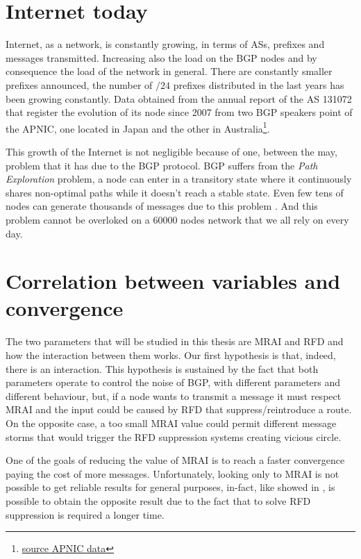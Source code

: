 \section{Internet today}
\label{sec:internet_today}

Internet, as a network, is constantly growing, in terms of \acp{AS}, prefixes
and messages transmitted.
Increasing also the load on the \ac{BGP} nodes and by consequence the load
of the network in general.
There are constantly smaller prefixes announced, the number of $/24$ prefixes
distributed in the last years has been growing constantly.
Data obtained from the annual report of the \ac{AS} 131072 that register the
evolution of its node since \num{2007} from two \ac{BGP}
speakers point of the \ac{APNIC}, one located in Japan and the other in
Australia\footnote{\href{https://blog.apnic.net/2021/01/05/bgp-in-2020-the-bgp-table/}{source APNIC data}}.

This growth of the Internet is not negligible because of one, between the may,
problem that it has due to the \ac{BGP} protocol.
\ac{BGP} suffers from the \textit{Path Exploration} problem, a node can enter in
a transitory state where it continuously shares non-optimal paths while it
doesn't reach a stable state.
Even few tens of nodes can generate thousands of messages due to this problem
\cite{deshpande2004impact}.
And this problem cannot be overloked on a \num{60000} nodes network that we all
rely on every day.

\section{Correlation between variables and convergence}
\label{sec:bgp_correlations}

The two parameters that will be studied in this thesis are \ac{MRAI} and \ac{RFD}
and how the interaction between them works.
Our first hypothesis is that, indeed, there is an interaction.
This hypothesis is sustained by the fact that both parameters operate to
control the noise of \ac{BGP}, with different parameters and different behaviour,
but, if a node wants to transmit a message it must respect \ac{MRAI} and the input
could be caused by \ac{RFD} that suppress/reintroduce a route.
On the opposite case, a too small \ac{MRAI} value could permit different message
storms that would trigger the \ac{RFD} suppression systems creating vicious circle.

One of the goals of reducing the value of \ac{MRAI} is to reach a faster convergence
paying the cost of more messages.
Unfortunately, looking only to \ac{MRAI} is not possible to get reliable results
for general purposes, in-fact, like showed in , is possible
to obtain the opposite result due to the fact that to solve \ac{RFD} suppression
is required a longer time.

